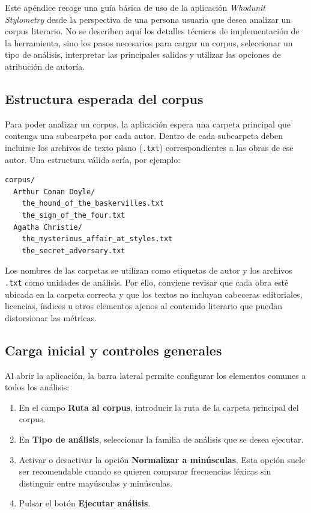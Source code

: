 \documentclass[IB]{TFUOC}%
\begin{document}
Este apéndice recoge una guía básica de uso de la aplicación \textit{Whodunit Stylometry} desde la perspectiva de una persona usuaria que desea analizar un corpus literario. No se describen aquí los detalles técnicos de implementación de la herramienta, sino los pasos necesarios para cargar un corpus, seleccionar un tipo de análisis, interpretar las principales salidas y utilizar las opciones de atribución de autoría.

\subsection*{Estructura esperada del corpus}

Para poder analizar un corpus, la aplicación espera una carpeta principal que contenga una subcarpeta por cada autor. Dentro de cada subcarpeta deben incluirse los archivos de texto plano (\texttt{.txt}) correspondientes a las obras de ese autor. Una estructura válida sería, por ejemplo:

\begin{verbatim}
corpus/
  Arthur Conan Doyle/
    the_hound_of_the_baskervilles.txt
    the_sign_of_the_four.txt
  Agatha Christie/
    the_mysterious_affair_at_styles.txt
    the_secret_adversary.txt
\end{verbatim}

Los nombres de las carpetas se utilizan como etiquetas de autor y los archivos \texttt{.txt} como unidades de análisis. Por ello, conviene revisar que cada obra esté ubicada en la carpeta correcta y que los textos no incluyan cabeceras editoriales, licencias, índices u otros elementos ajenos al contenido literario que puedan distorsionar las métricas.

\subsection*{Carga inicial y controles generales}

Al abrir la aplicación, la barra lateral permite configurar los elementos comunes a todos los análisis:

\begin{enumerate}
    \item En el campo \textbf{Ruta al corpus}, introducir la ruta de la carpeta principal del corpus.
    \item En \textbf{Tipo de análisis}, seleccionar la familia de análisis que se desea ejecutar.
    \item Activar o desactivar la opción \textbf{Normalizar a minúsculas}. Esta opción suele ser recomendable cuando se quieren comparar frecuencias léxicas sin distinguir entre mayúsculas y minúsculas.
    \item Pulsar el botón \textbf{Ejecutar análisis}.
\end{enumerate}
\end{document}
